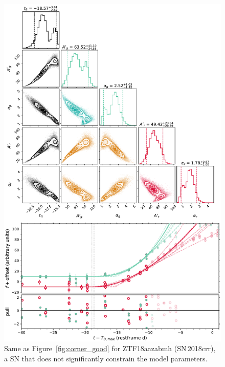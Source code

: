 \documentclass[twocolumn]{./aastex63}
\begin{document}
\begin{figure}
    \centering
    \includegraphics[width=5.2in]{./figures/Fig3.pdf}
    \caption{Same as Figure~\ref{fig:corner_good} for ZTF18aazabmh
    (SN\,2018crr), a SN that does not significantly constrain the model
    parameters.}
    \label{fig:corner_bad}
\end{figure}
\end{document}
